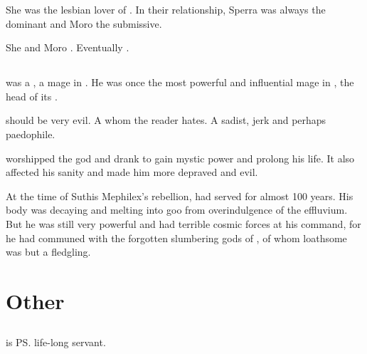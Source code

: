 She was the lesbian lover of \MoroCobrel. 
In their relationship, Sperra was always the dominant and Moro the submissive. 

She and Moro . 
Eventually . 















\section{\UldraanKerross}
\UldraanKerross was a \dax, a \rethyax mage in \Yormis. 
He was once the most powerful and influential mage in \Yormis, the head of its \baccon. 

\Uldraan should be very evil. 
A  whom the reader hates. 
A sadist, jerk and perhaps paedophile. 

\Uldraan worshipped the god \Ubloth and drank  to gain mystic power and prolong his life. 
It also affected his sanity and made him more depraved and evil.

At the time of Suthis Mephilex's rebellion, \Uldraan had served \Ubloth for almost 100 years. 
His body was decaying and melting into goo from overindulgence of the effluvium. 
But he was still very powerful and had terrible cosmic forces at his command, for he had communed with the forgotten slumbering gods of \Miith, of whom loathsome \Ubloth was but a fledgling. 























\chapter{Other}
\section{\Criseis}
\index{\Criseis}
\Criseis{} is \ps{\Ishnaruchaefir} life-long servant. 


